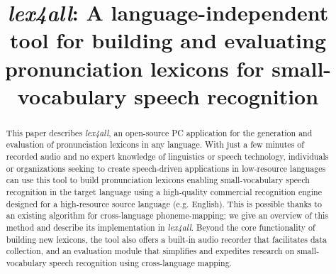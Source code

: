 \documentclass[11pt]{article}
\title{\textit{lex4all}: A language-independent tool for building and evaluating pronunciation lexicons for small-vocabulary speech recognition}
\date{}
\begin{document}
\maketitle

\begin{abstract}
This paper describes \textit{lex4all}, an open-source PC application for the generation and evaluation of pronunciation lexicons in any language. With just a few minutes of recorded audio and no expert knowledge of linguistics or speech technology, individuals or organizations seeking to create speech-driven applications in low-resource languages can use this tool to build pronunciation lexicons enabling small-vocabulary speech recognition in the target language using a high-quality commercial recognition engine designed for a high-resource source language (e.g. English). This is possible thanks to an existing algorithm for cross-language phoneme-mapping; we give an overview of this method and describe its implementation in \textit{lex4all}. Beyond the core functionality of building new lexicons, the tool also offers a built-in audio recorder that facilitates data collection, and an evaluation module that simplifies and expedites research on small-vocabulary speech recognition using cross-language mapping. 
\end{abstract}


%
\end{document}
